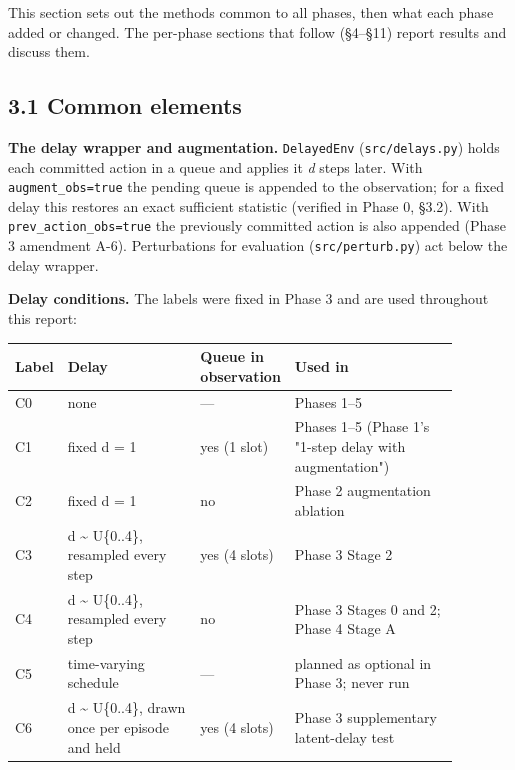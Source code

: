 \documentclass[11pt]{article}
\begin{document}
This section sets out the methods common to all phases, then what each phase added or changed. The per-phase sections that follow (\S{}4--\S{}11) report results and discuss them.



\subsection*{3.1 Common elements}



\textbf{The delay wrapper and augmentation.} \texttt{DelayedEnv} (\texttt{src/delays.py}) holds each committed action in a queue and applies it \emph{d} steps later. With \texttt{augment\_\allowbreak{}obs=true} the pending queue is appended to the observation; for a fixed delay this restores an exact sufficient statistic (verified in Phase 0, \S{}3.2). With \texttt{prev\_\allowbreak{}action\_\allowbreak{}obs=true} the previously committed action is also appended (Phase 3 amendment A-6). Perturbations for evaluation (\texttt{src/\allowbreak{}perturb.\allowbreak{}py}) act below the delay wrapper.



\textbf{Delay conditions.} The labels were fixed in Phase 3 and are used throughout this report:



\begin{center}\small\begin{tabular}{>{\raggedright\arraybackslash}p{0.057\linewidth}>{\raggedright\arraybackslash}p{0.303\linewidth}>{\raggedright\arraybackslash}p{0.139\linewidth}>{\raggedright\arraybackslash}p{0.379\linewidth}}
\toprule
Label & Delay & Queue in observation & Used in \\
\midrule
C0 & none & --- & Phases 1--5 \\
C1 & fixed d = 1 & yes (1 slot) & Phases 1--5 (Phase 1's "1-step delay with augmentation") \\
C2 & fixed d = 1 & no & Phase 2 augmentation ablation \\
C3 & d \textasciitilde{} U\{0..4\}, resampled every step & yes (4 slots) & Phase 3 Stage 2 \\
C4 & d \textasciitilde{} U\{0..4\}, resampled every step & no & Phase 3 Stages 0 and 2; Phase 4 Stage A \\
C5 & time-varying schedule & --- & planned as optional in Phase 3; never run \\
C6 & d \textasciitilde{} U\{0..4\}, drawn once per episode and held & yes (4 slots) & Phase 3 supplementary latent-delay test \\
\bottomrule
\end{tabular}\end{center}
\end{document}
